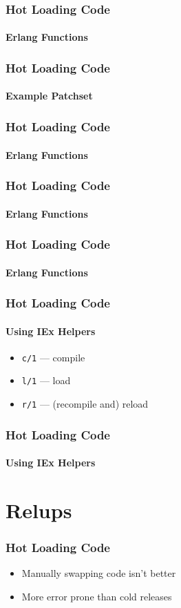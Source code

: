 \documentclass{beamer}
\begin{document}
\begin{frame}
  \frametitle{Hot Loading Code}
  \framesubtitle{Erlang Functions}
  
\end{frame}

\begin{frame}
  \frametitle{Hot Loading Code}
  \framesubtitle{Example Patchset}
  
\end{frame}

\begin{frame}
  \frametitle{Hot Loading Code}
  \framesubtitle{Erlang Functions}
  
\end{frame}

\begin{frame}
  \frametitle{Hot Loading Code}
  \framesubtitle{Erlang Functions}
  
\end{frame}

\begin{frame}
  \frametitle{Hot Loading Code}
  \framesubtitle{Erlang Functions}
  
\end{frame}

\begin{frame}
\frametitle{Hot Loading Code}
\framesubtitle{Using IEx Helpers}
\begin{itemize}
\item{\texttt{c/1} --- compile}
\item{\texttt{l/1} --- load}
\item{\texttt{r/1} --- (recompile and) reload}
\end{itemize}
\end{frame}

\begin{frame}
\frametitle{Hot Loading Code}
\framesubtitle{Using IEx Helpers}

\end{frame}

\section{Relups}

\begin{frame}
\frametitle{Hot Loading Code}
\begin{itemize}
\item{Manually swapping code isn't better}
\item{More error prone than cold releases}
\end{itemize}
\end{frame}
\end{document}
